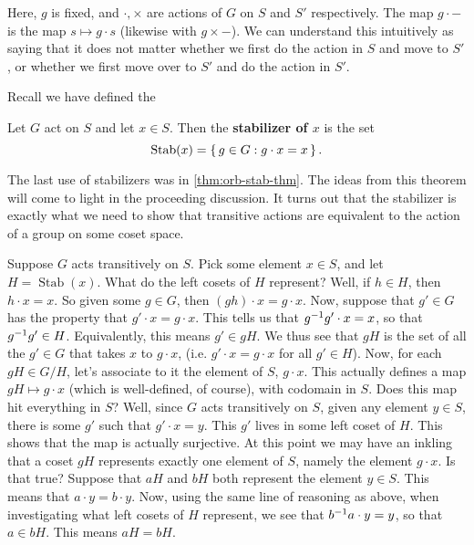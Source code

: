 \documentclass[./main.tex]{subfiles}
\begin{document}
Here, $g$ is fixed, and $\cdot, \times$ are actions of $G$ on $S$ and $S'$
respectively. The map $g \cdot -$ is the map $s \mapsto g \cdot s$ (likewise
with $g \times -$). We can understand this intuitively as saying that it does
not matter whether we first do the action in $S$ and move to $S'$, or whether we
first move over to $S'$ and do the action in $S'$.

Recall we have defined the
\begin{definition}
    Let $G$ act on $S$ and let $x \in S$. Then the \textbf{stabilizer of $x$} is the set 
    \[
        \operatorname{Stab}(x) = \set{ g \in G: g \cdot x = x}.
    \]
\end{definition}
The last use of stabilizers was in \cref{thm:orb-stab-thm}. The ideas from this
theorem will come to light in the proceeding discussion. It turns out that the
stabilizer is exactly what we need to show that transitive actions are
equivalent to the action of a group on some coset space. 

Suppose $G$ acts transitively on $S$. Pick some element $x \in S$, and let $H =
\operatorname{Stab}(x)$. What do the left cosets of $H$ represent? Well, if $h
\in H$, then $h \cdot x = x$. So given some $g \in G$, then $(gh) \cdot x = g
\cdot x$. Now, suppose that $g' \in G$ has the property that $g' \cdot x = g
\cdot x$. This tells us that $g^{-1} g' \cdot x = x$, so that $g^{-1} g' \in H$.
Equivalently, this means $g' \in gH$. We thus see that $gH$ is the set of all
the $g' \in G$ that takes $x$ to $g \cdot x$, (i.e. $g' \cdot x = g \cdot x$ for
all $g' \in H$). Now, for each $gH \in G/H$, let's associate to it the element
of $S$, $g \cdot x$. This actually defines a map $gH \mapsto g \cdot x$ (which
is well-defined, of course), with codomain in $S$. Does this map hit everything
in $S$? Well, since $G$ acts transitively on $S$, given any element $y \in S$,
there is some $g'$ such that $g' \cdot x = y$. This $g'$ lives in some left
coset of $H$. This shows that the map is actually surjective. At this point we
may have an inkling that a coset $gH$ represents exactly one element of $S$,
namely the element $g \cdot x$. Is that true? Suppose that $aH$ and $bH$ both
represent the element $y \in S$. This means that $a \cdot y = b \cdot y$. Now,
using the same line of reasoning as above, when investigating what left cosets
of $H$ represent, we see that $b^{-1} a \cdot y = y$, so that $a \in bH$. This
means $aH = bH$.
\end{document}
